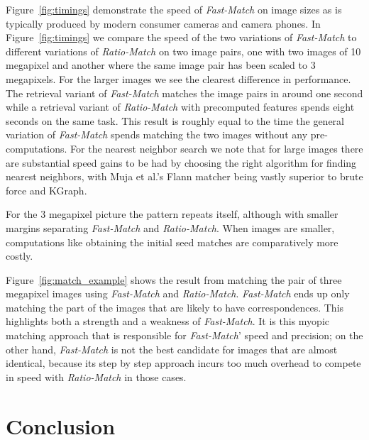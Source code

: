 \documentclass[runningheads]{llncs}
\begin{document}
Figure~\ref{fig:timings} demonstrate the speed of \emph{Fast-Match} on image sizes as is typically produced by modern consumer cameras and camera phones. In Figure~\ref{fig:timings} we compare the speed of the two variations of \emph{Fast-Match} to different variations of \emph{Ratio-Match} on two image pairs, one with two images of 10 megapixel and another where the same image pair has been scaled to 3 megapixels. For the larger images we see the clearest difference in performance. The retrieval variant of \emph{Fast-Match} matches the image pairs in around one second while a retrieval variant of \emph{Ratio-Match} with precomputed features spends eight seconds on the same task. This result is roughly equal to the time the general variation of \emph{Fast-Match} spends matching the two images without any pre-computations. For the nearest neighbor search we note that for large images there are substantial speed gains to be had by choosing the right algorithm for finding nearest neighbors, with Muja et al.'s Flann matcher being vastly superior to brute force and KGraph. 

For the 3 megapixel picture the pattern repeats itself, although with smaller margins separating \emph{Fast-Match} and \emph{Ratio-Match}. When images are smaller, computations like obtaining the initial seed matches are comparatively more costly.

Figure~\ref{fig:match_example} shows the result from matching the pair of three megapixel images using \emph{Fast-Match} and \emph{Ratio-Match}. %
\emph{Fast-Match} ends up only matching the part of the images that are likely to have correspondences. This highlights both a strength and a weakness of \emph{Fast-Match}. It is this myopic matching approach that is responsible for \emph{Fast-Match}' speed and precision; on the other hand, \emph{Fast-Match} is not the best candidate for images that are almost identical, because its step by step approach incurs too much overhead to compete in speed with \emph{Ratio-Match} in those cases.

\section{Conclusion}
\label{conclusion}
\end{document}
